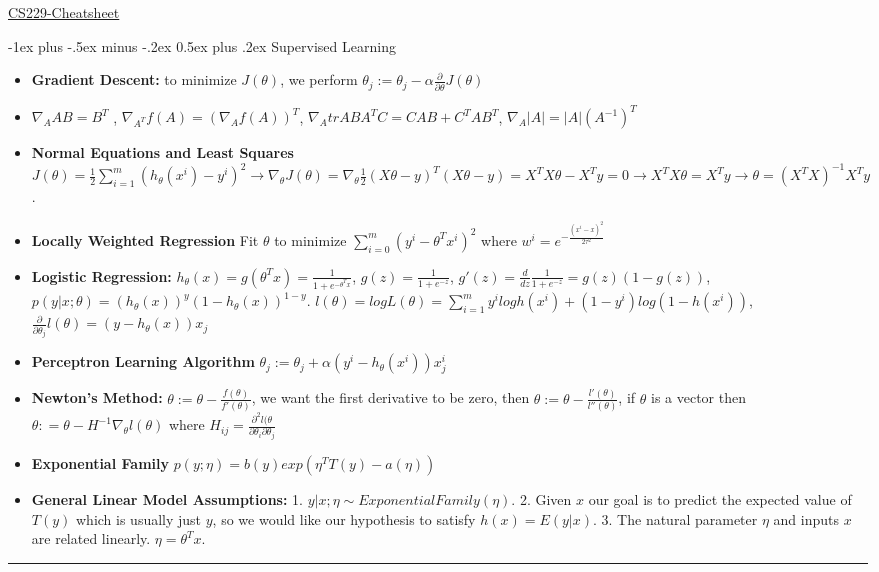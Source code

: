 \documentclass[10pt,landscape]{article}
\makeatletter
\renewcommand{\section}{\@startsection{section}{1}{0mm}%
                                {-1ex plus -.5ex minus -.2ex}%
                                {0.5ex plus .2ex}%
                                {\normalfont\large\bfseries}}
\makeatother
\begin{document}
\raggedright
\footnotesize
\begin{multicols}{3}


\setlength{\premulticols}{1pt}
\setlength{\postmulticols}{1pt}
\setlength{\multicolsep}{1pt}
\setlength{\columnsep}{2pt}

\begin{center}
     \Large{\underline{CS229-Cheatsheet}} \\
\end{center}

\section{Supervised Learning}
\begin{itemize}
\item \textbf{Gradient Descent:} to minimize $J(\theta)$, we perform $\theta_j := \theta_j	 - \alpha \frac{\partial}{\partial \theta} J(\theta)$
\item $\nabla_A AB = B^T$ , $\nabla_{A^T} f(A) = (\nabla_A f(A))^T$, $\nabla_A tr ABA^TC = CAB + C^TAB^T$, $\nabla_A |A| = |A| (A^{-1})^T$

\item \textbf{Normal Equations and Least Squares} $J(\theta) = \frac{1}{2}\sum_{i = 1}^{m}(h_\theta(x^i)- y^i)^2 \rightarrow \nabla_\theta J(\theta)  = \nabla_\theta \frac{1}{2}(X\theta -y)^T(X\theta -y) =  X^TX\theta - X^Ty  = 0 \rightarrow X^TX\theta = X^Ty \rightarrow \theta = (X^TX)^{-1}X^Ty$. 
\item \textbf{Locally Weighted Regression} Fit $\theta$ to minimize $\sum_{i = 0}^{m	} (y^i-\theta^Tx^i)^2$ where $w^i = e^{-\frac{(x^i-x)^2}{2\tau^2}}$
\item \textbf{Logistic Regression:} $h_\theta(x) = g(\theta^T x) = \frac{1}{1+ e^{-\theta^Tx}}$, $g(z) = \frac{1}{1+e^{-z}}$, $g'(z) = \frac{d}{dz}\frac{1}{1+e^{-z}} = g(z)(1-g(z))$, $p(y |x; \theta) = (h_\theta(x))^y(1-h_\theta(x))^{1-y}$. $l(\theta) = log L(\theta) = \sum_{i = 1}^{m} y^i logh(x^i) + (1-y^i) log(1-h(x^i))$, $\frac{\partial}{\partial \theta_j} l(\theta) = (y- h_\theta(x))x_j$
\item \textbf{Perceptron Learning Algorithm} $\theta_j := \theta_j + \alpha (y^i - h_\theta(x^i))x_j^i$
\item \textbf{Newton's Method: } $\theta := \theta - \frac{f(\theta)}{f'(\theta)}$, we want the first derivative to be zero, then $\theta := \theta - \frac{l'(\theta)}{l''(\theta)}$, if $\theta$ is a vector then $\theta: = \theta - H^{-1}\nabla_\theta l(\theta)$ where $H_{ij} = \frac{\partial ^2 l(\theta}{\partial \theta_i \partial \theta_j}$
\item \textbf{Exponential Family}  $p(y; \eta)  =b(y)exp(\eta^TT(y) - a(\eta))$
\item \textbf{General Linear Model Assumptions:} 1. $y|x; \eta \sim ExponentialFamily(\eta)$. 2. Given $x$ our goal is to predict the expected value of $T(y)$ which is usually just $y$, so we would like our hypothesis to satisfy $h(x) = E(y|x)$. 3. The natural parameter $\eta$ and inputs $x$ are related linearly. $\eta = \theta^Tx$. 
\end{itemize}

\rule{0.3\linewidth}{0.25pt}
\scriptsize


\end{multicols}
\end{document}
